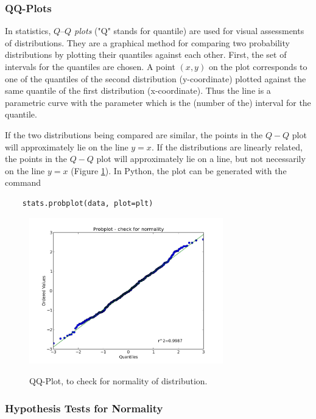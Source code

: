 \subsubsection{QQ-Plots} 

 In statistics, \emph{$Q–Q$ plots} ("Q" stands for quantile) are used for visual assessments of distributions. They are a graphical method for comparing two probability distributions by plotting their quantiles against each other. First, the set of intervals for the quantiles are chosen. A point $(x,y)$ on the plot corresponds to one of the quantiles of the second distribution (y-coordinate) plotted against the same quantile of the first distribution (x-coordinate). Thus the line is a parametric curve with the parameter which is the (number of the) interval for the quantile.

If the two distributions being compared are similar, the points in the $Q-Q$ plot will approximately lie on the line $y = x$. If the distributions are linearly related, the points in the $Q-Q$ plot will approximately lie on a line, but not necessarily on the line $y = x$ (Figure \ref{fig:qqplot}). In Python, the plot can be generated with the command

\begin{lstlisting}
    stats.probplot(data, plot=plt)
\end{lstlisting}

\begin{figure}
  \centering
  \includegraphics[width=0.75\textwidth]{../Images/ProbPlot.png}\\
  \caption{QQ-Plot, to check for normality of distribution.}\label{fig:qqplot}
\end{figure}

\subsubsection{Hypothesis Tests for Normality}

